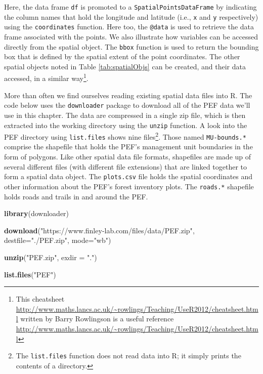 \documentclass[
]{krantz}
\newenvironment{Shaded}{\begin{snugshade}}{\end{snugshade}}
\newcommand{\DataTypeTok}[1]{\textcolor[rgb]{0.13,0.29,0.53}{#1}}
\newcommand{\KeywordTok}[1]{\textcolor[rgb]{0.13,0.29,0.53}{\textbf{#1}}}
\newcommand{\NormalTok}[1]{#1}
\newcommand{\StringTok}[1]{\textcolor[rgb]{0.31,0.60,0.02}{#1}}
\begin{document}
Here, the data frame \texttt{df} is promoted to a \texttt{SpatialPointsDataFrame} by indicating the column names that hold the longitude and latitude (i.e., \texttt{x} and \texttt{y} respectively) using the \texttt{coordinates} function. Here too, the \texttt{@data} is used to retrieve the data frame associated with the points. We also illustrate how variables can be accessed directly from the spatial object. The \texttt{bbox} function is used to return the bounding box that is defined by the spatial extent of the point coordinates. The other spatial objects noted in Table \ref{tab:spatialObjs} can be created, and their data accessed, in a similar way\footnote{This cheatsheet \url{http://www.maths.lancs.ac.uk/~rowlings/Teaching/UseR2012/cheatsheet.html} written by Barry Rowlingson is a useful reference \url{http://www.maths.lancs.ac.uk/~rowlings/Teaching/UseR2012/cheatsheet.html}}.

More than often we find ourselves reading existing spatial data files into R. The code below uses the \texttt{downloader} package to download all of the PEF data we'll use in this chapter. The data are compressed in a single zip file, which is then extracted into the working directory using the \texttt{unzip} function. A look into the PEF directory using \texttt{list.files} shows nine files\footnote{The \texttt{list.files} function does not read data into R; it simply prints the contents of a directory.}. Those named \texttt{MU-bounds.*} comprise the shapefile that holds the PEF's management unit boundaries in the form of polygons. Like other spatial data file formats, shapefiles are made up of several different files (with different file extensions) that are linked together to form a spatial data object. The \texttt{plots.csv} file holds the spatial coordinates and other information about the PEF's forest inventory plots. The \texttt{roads.*} shapefile holds roads and trails in and around the PEF.

\begin{Shaded}
\begin{Highlighting}[]
\KeywordTok{library}\NormalTok{(downloader)}

\KeywordTok{download}\NormalTok{(}\StringTok{"https://www.finley{-}lab.com/files/data/PEF.zip"}\NormalTok{, }
         \DataTypeTok{destfile=}\StringTok{"./PEF.zip"}\NormalTok{, }\DataTypeTok{mode=}\StringTok{"wb"}\NormalTok{) }

\KeywordTok{unzip}\NormalTok{(}\StringTok{"PEF.zip"}\NormalTok{, }\DataTypeTok{exdir =} \StringTok{"."}\NormalTok{)}

\KeywordTok{list.files}\NormalTok{(}\StringTok{"PEF"}\NormalTok{)}
\end{Highlighting}
\end{Shaded}
\end{document}
